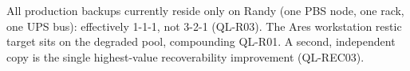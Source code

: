 \begin{callout}
All production backups currently reside only on Randy (one PBS node, one rack, one UPS
bus): effectively 1-1-1, not 3-2-1 (QL-R03). The Ares workstation restic target sits on
the degraded  pool, compounding QL-R01. A second, independent copy is the
single highest-value recoverability improvement (QL-REC03).
\end{callout}
